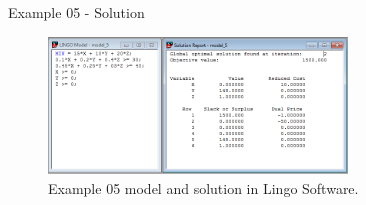 \begin{frame}{Example 05 - Solution}
\begin{figure}
    \includegraphics[width=300px]{slides/ex05/screenshot.png}
    \caption{Example 05 model and solution in Lingo Software.}
\end{figure}
\end{frame}
